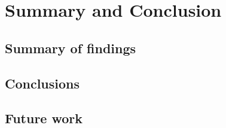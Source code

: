 \chapter{Summary and Conclusion}\label{chapter:summary_conclusion}
\section{Summary of findings}\label{section:summary_findings}
\section{Conclusions}\label{section:conclusions}
\section{Future work}\label{section:future_work}
